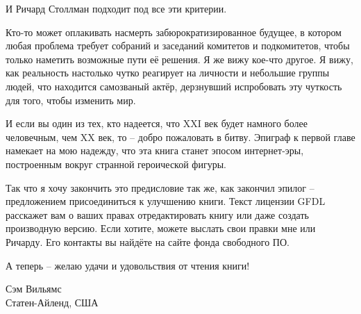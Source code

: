 И Ричард Столлман подходит под все эти критерии.

Кто-то может оплакивать насмерть забюрократизированное будущее,
в котором любая проблема требует собраний и заседаний комитетов
и подкомитетов, чтобы только наметить возможные пути её решения.
Я же вижу кое-что другое. Я вижу, как реальность настолько чутко
реагирует на личности и небольшие группы людей, что находится
самозваный актёр, дерзнувший испробовать эту чуткость для того,
чтобы изменить мир.

И если вы один из тех, кто надеется, что XXI век будет намного более
человечным, чем XX век, то -- добро пожаловать в битву. Эпиграф к
первой главе намекает на мою надежду, что эта книга станет эпосом
интернет-эры, построенным вокруг странной героической фигуры.

Так что я хочу закончить это предисловие так же, как закончил
эпилог -- предложением присоединиться к улучшению книги. Текст
лицензии GFDL расскажет вам о ваших правах отредактировать книгу
или даже создать производную версию. Если хотите, можете выслать
свои правки мне или Ричарду. Его контакты вы найдёте на сайте
фонда свободного ПО.

А теперь -- желаю удачи и удовольствия от чтения книги!

\vspace{0.5in}
\noindent Сэм Вильямс\\
\noindent Статен-Айленд, США
